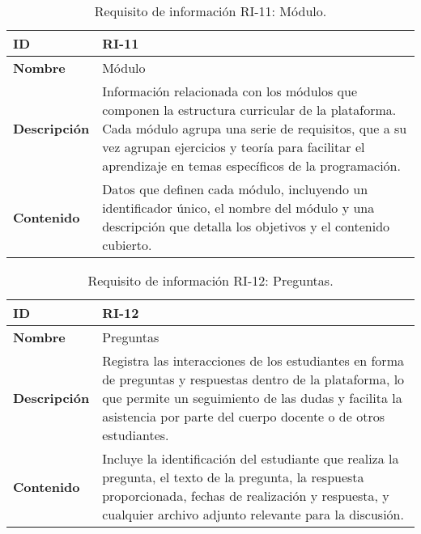 \begin{table}[H]
    \centering
    \begin{tabular}{|l|p{9.5cm}|}
        \hline
        \textbf{ID} & RI-11 \\
        \hline
        \textbf{Nombre} & Módulo \\
        \hline
        \textbf{Descripción} & Información relacionada con los módulos que componen la estructura curricular de la plataforma. Cada módulo agrupa una serie de requisitos, que a su vez agrupan ejercicios y teoría para facilitar el aprendizaje en temas específicos de la programación. \\
        \hline
        \textbf{Contenido} & Datos que definen cada módulo, incluyendo un identificador único, el nombre del módulo y una descripción que detalla los objetivos y el contenido cubierto.  \\
        \hline
    \end{tabular}
    \caption{Requisito de información RI-11: Módulo.}
    \label{table:req-RI13}
\end{table}

\begin{table}[H]
    \centering
    \begin{tabular}{|l|p{9.5cm}|}
        \hline
        \textbf{ID} & RI-12 \\
        \hline
        \textbf{Nombre} & Preguntas \\
        \hline
        \textbf{Descripción} & Registra las interacciones de los estudiantes en forma de preguntas y respuestas dentro de la plataforma, lo que permite un seguimiento de las dudas y facilita la asistencia por parte del cuerpo docente o de otros estudiantes.  \\
        \hline
        \textbf{Contenido} & Incluye la identificación del estudiante que realiza la pregunta, el texto de la pregunta, la respuesta proporcionada, fechas de realización y respuesta, y cualquier archivo adjunto relevante para la discusión. \\
        \hline
    \end{tabular}
    \caption{Requisito de información RI-12: Preguntas.}
    \label{table:req-RI14}
\end{table}

